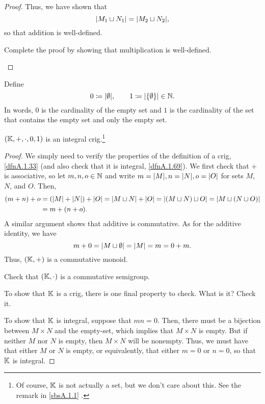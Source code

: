 \begin{dfn}
\begin{prp}
\begin{proof}
Thus, we have shown that
\begin{equation}
\lvert M_1\sqcup N_1\rvert=\lvert M_2\sqcup N_2\rvert,
\end{equation}
so that addition is well-defined.

\begin{exr}
Complete the proof by showing that multiplication is well-defined.
\end{exr}
\end{proof}
\end{prp}
\end{dfn}

\begin{dfn}[$0$ and $1$]
Define
\begin{equation}
0\coloneqq \lvert\emptyset\rvert,\qquad 1\coloneqq \lvert\{ \emptyset \}\rvert\in \mathbb{N} .
\end{equation}
In words, $0$ is the cardinality of the empty set and $1$ is the cardinality of the set that contains the empty set and only the empty set.
\end{dfn}
\begin{prp}\label{prpA.1.16}
$(\mathbb{K} ,+,\cdot ,0,1)$ is an integral crig.\footnote{Of course, $\mathbb{K}$ is not actually a set, but we don't care about this.  See the remark in \cref{sbsA.1.1} .}
\begin{proof}
We simply need to verify the properties of the definition of a crig, \cref{dfnA.1.33} (and also check that it is integral, \cref{dfnA.1.69}).  We first check that $+$ is associative, so let $m,n,o\in \mathbb{N}$ and write $m=\lvert M\rvert,n=\lvert N\rvert,o=\lvert O\rvert$ for sets $M$, $N$, and $O$.  Then,
\begin{equation}
\begin{split}
(m+n)+o & =\left( \lvert M\rvert+\lvert N\rvert\right) +\lvert O\rvert=\lvert M\sqcup N\rvert+\lvert O\rvert=\lvert(M\sqcup N)\sqcup O\rvert=\lvert M\sqcup (N\sqcup O)\rvert \\
& =m+(n+o).
\end{split}
\end{equation}
A similar argument shows that additive is commutative.  As for the additive identity, we have
\begin{equation}
m+0=\lvert M\sqcup \emptyset\rvert=\lvert M\rvert=m=0+m.
\end{equation}
Thus, $(\mathbb{K} ,+)$ is a commutative monoid.

\begin{exr}
Check that $(\mathbb{K} ,\cdot )$ is a commutative semigroup.
\end{exr}
\begin{exr}
To show that $\mathbb{K}$ is a crig, there is one final property to check.  What is it?  Check it.
\end{exr}

To show that $\mathbb{K}$ is integral, suppose that $mn=0$.  Then, there must be a bijection between $M\times N$ and the empty-set, which implies that $M\times N$ is empty.  But if neither $M$ nor $N$ is empty, then $M\times N$ will be nonempty.  Thus, we must have that either $M$ or $N$ is empty, or equivalently, that either $m=0$ or $n=0$, so that $\mathbb{K}$ is integral.
\end{proof}
\end{prp}

